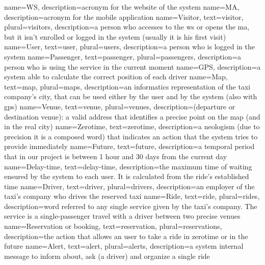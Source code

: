 {
	name=WS,
	description={acronym for the website of the system}
}
{
	name=MA,
	description={acronym for the mobile application}
}
{
	name=Visitor,
	text=visitor,
	plural=visitors,
	description={a person who accesses to the \gls{ws} or opens the \gls{ma}, but it isn't enrolled or logged in the system (usually it is his first visit)}
}
{
	name=User,
	text=user,
	plural=users,
	description={a person who is logged in the system}
}
{
	name=Passenger,
	text=passenger,
	plural=passengers,
	description={a person who is using the service in the current moment}
}
{
	name=GPS,
	description={a system able to calculate the correct position of each driver}
}
{
	name=Map,
	text=map,
	plural=maps,
	description={an informatics representation of the taxi company's city, that can be used either by the user and by the system (also with \gls{gps})}
} 
{
	name=Venue,
	text=venue,
	plural=venues,
	description={(departure or destination venue): a valid address that identifies a precise point on the map (and in the real city)}
}
{
	name=Zerotime,
	text=zerotime,
	description={a neologism (due to precision it is a composed word) that indicates an action that the system tries to provide immediately}
}
{
	name=Future,
	text=future,
	description={a temporal period that in our project is between 1 hour and 30 days from the current day}
}
{
	name=Delay-time,
	text=delay-time,
	description={the maximum time of waiting ensured by the system to each user. It is calculated from the ride's established time}
}
{
	name=Driver,
	text=driver,
	plural=drivers,
	description={an employer of the taxi's company who drives the reserved taxi}
}
{
	name=Ride,
	text=ride,
	plural=rides,
	description={word referred to any single service given by the taxi's company. The service is a single-passenger travel with a driver between two precise venues}
}
{
	name=Reservation or booking,
	text=reservation,
	plural=reservations,
	description={the action that allows an user to take a \gls{ride} in \gls{zerotime} or in the \gls{future}}
}
{
	name=Alert,
	text=alert,
	plural=alerts,
	description={a system internal message to inform about, ask (a \gls{driver}) and organize a single \gls{ride}}
}
	

\makeglossaries
